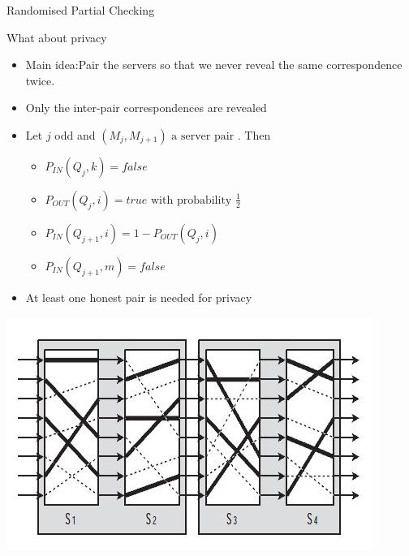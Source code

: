 \documentclass{beamer}
\begin{document}
\begin{frame}[allowframebreaks]{Randomised Partial Checking}
\begin{block}{What about privacy}
\begin{itemize}
\item Main idea:Pair the servers so that we never reveal the same correspondence twice.
\item Only the inter-pair correspondences are revealed
\item Let $j$ odd and $(M_j,M_{j+1}) \text{ a server pair }$. Then
\begin{itemize}
\item $P_{IN}(Q_j,k)=false$
\item $P_{OUT}(Q_j,i)=true \text{ with probability } \frac{1}{2}$
\item $P_{IN}(Q_{j+1},i)=1-P_{OUT}(Q_j,i)$
\item $P_{IN}(Q_{j+1},m)=false$
\end{itemize}
\item At least one honest pair is needed for privacy
\end{itemize}
\end{block}

\begin{center}
\includegraphics[scale=0.5]{rpc.jpg}
\end{center}


\end{frame}
\end{document}
